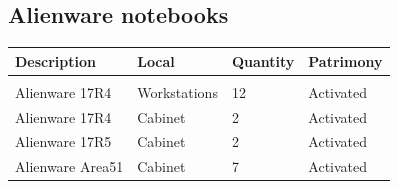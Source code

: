 \subsection{Alienware notebooks}
\begin{tabularx}{\textwidth}{ Y  Y  Y  Y }
    \textbf{Description} &  \textbf{Local} &  \textbf{Quantity} & \textbf{Patrimony}\\
    \hline \\
     Alienware 17R4 & Workstations & 12 & Activated \\
     Alienware 17R4 & Cabinet & 2 & Activated \\
     Alienware 17R5 & Cabinet & 2 & Activated \\
     Alienware Area51 & Cabinet & 7 & Activated
\end{tabularx}
\vspace{1cm}

